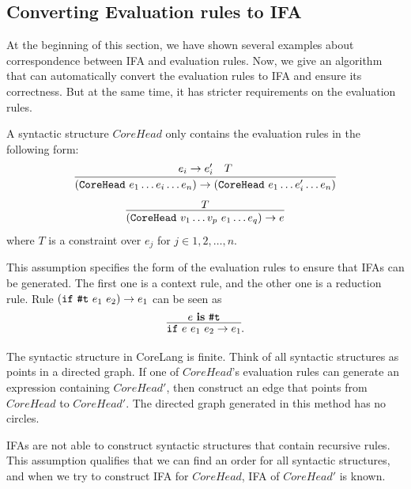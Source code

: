 \subsection{Converting Evaluation rules to IFA}

At the beginning of this section, we have shown several examples about correspondence between IFA and evaluation rules. Now, we give an algorithm that can automatically convert the evaluation rules to IFA and ensure its correctness. But at the same time, it has stricter requirements on the evaluation rules.


\begin{Asm}
    \label{Asm:rules}
    A syntactic structure $CoreHead$ only contains the evaluation rules in the following form:
    \[
        \infer
        {(\m{CoreHead}~e_1 \ldots e_i \ldots e_n) \to (\m{CoreHead}~e_1 \ldots e_i' \ldots e_n)}{e_i \to e_i'\quad T}
    \]
    \[
        \infer{(\m{CoreHead}~v_1 \ldots v_p~e_1 \ldots e_q) \to e}{T}
    \]
    where $T$ is a constraint over $e_j$ for $j \in 1,2,\ldots,n$.
\end{Asm}

This assumption specifies the form of the evaluation rules to ensure that IFAs can be generated. The first one is a context rule, and the other one is a reduction rule. Rule $(\mbox{\tt if}~\mbox{\tt \#t}~e_1~e_2) \to e_1$ can be seen as \[\infer{\m{if}~e~e_1~e_2 \to e_1}{e~\key{is}~\m{\#t}}.\]

\begin{Asm}
    \label{Asm:orderliness}
    The syntactic structure in CoreLang is finite. Think of all syntactic structures as points in a directed graph. If one of $CoreHead$'s evaluation rules can generate an expression containing $CoreHead'$, then construct an edge that points from $CoreHead$ to $CoreHead'$. The directed graph generated in this method has no circles.
\end{Asm}

IFAs are not able to construct syntactic structures that contain recursive rules. This assumption qualifies that we can find an order for all syntactic structures, and when we try to construct IFA for $CoreHead$, IFA of $CoreHead'$ is known.

